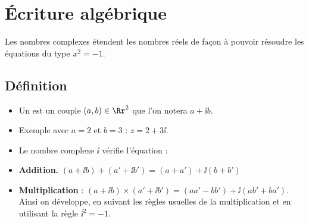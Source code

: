 \documentclass[11pt,class=report,crop=false]{standalone}
\begin{document}












\section{Écriture algébrique}

Les nombres complexes étendent les nombres réels de façon à pouvoir résoudre les équations du type $x^2=-1$.


\subsection{Définition}

\begin{itemize}
  \item Un  est un couple $(a, b) \in \Rr^2$ que l'on notera $a + \ii b$. 
  
  \item Exemple avec $a=2$ et $b=3$ : $z = 2 + 3\ii$.  
  
  \item Le nombre complexe $\ii$ vérifie l'équation : 
  
  
  \item \textbf{Addition.} $(a + \ii b) + (a' + \ii b') =
  (a + a') + \ii  (b + b')$
  \item \textbf{Multiplication} : $(a + \ii b) \times (a' + \ii b')
    = (aa' - bb') + \ii  (ab' + ba')$. 
    Ainsi on développe, en suivant les règles usuelles de la multiplication et
    en utilisant la règle $\ii ^2 = - 1$.
\end{itemize}
\end{document}
